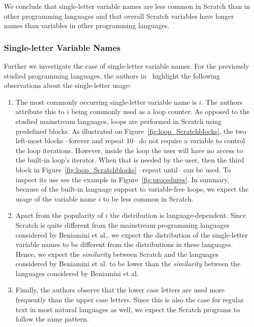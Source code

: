 \documentclass[conference]{IEEEtran}
\begin{document}
We conclude that single-letter variable names are less common in Scratch than in other programming languages and that overall Scratch variables have longer names than variables in other programming languages.

\subsubsection{Single-letter Variable Names}
\label{res:var:names}
Further we investigate the case of single-letter variable names. For the previously studied programming languages, the authors in~\cite{Beniamini} highlight the following observations about the single-letter usage: 

\begin{enumerate}[label=\emph{\alph*})]
\item The most commonly occurring single-letter variable name is $i$.
The authors attribute this to $i$ being commonly used as a loop counter. 
As opposed to the studied mainstream languages, loops are performed in Scratch using predefined blocks. 
As illustrated on Figure~\ref{fig:loop_Scratchblocks}, the  two left-most blocks --forever and repeat 10-- do not require a variable to control the loop iterations. However, inside the loop the user will have no access to the built-in loop's iterator. When that is needed by the user, then the third block in Figure~\ref{fig:loop_Scratchblocks} --repeat until-- can be used. To inspect its use see the example in Figure~\ref{fig:procedures}. In summary,  because of the built-in language support to variable-free loops, we expect the usage of the variable name $i$ to be less common in Scratch. \label{single-letter-vars:i}

\item Apart from the popularity of $i$ the distribution is language-dependent. 
Since Scratch is quite different from the mainstream programming languages considered by Beniamini et al., we expect the distribution of the single-letter variable names to be different from the distributions in these languages. 
Hence, we expect the \emph{similarity} between Scratch and the languages considered by Beniamini et al. to be lower than the \emph{similarity} between the languages considered by Beniamini et al. \label{single-letter-vars:similarity}

\item Finally, the authors observe that the lower case letters are used more frequently than the upper case letters. Since this is also the case for regular text in most natural languages as well, we expect the Scratch programs to follow the same pattern. \label{single-letter-vars:upercase:lowercase}
\end{enumerate}
\end{document}
